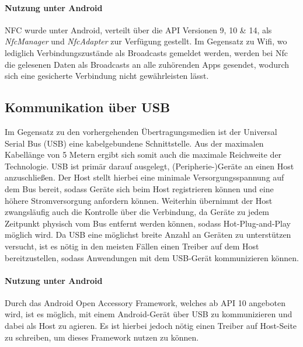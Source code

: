         \paragraph{Nutzung unter Android}
        NFC wurde unter Android, verteilt über die API Versionen 9, 10 \& 14,  als {\it NfcManager} und {\it NfcAdapter} zur Verfügung gestellt. Im Gegensatz zu Wifi, wo lediglich Verbindungszustände als Broadcasts gemeldet werden, werden bei Nfc die gelesenen Daten als Broadcasts an alle zuhörenden Apps gesendet, wodurch sich eine gesicherte Verbindung nicht gewährleisten lässt.

    \subsection{Kommunikation über USB}
        Im Gegensatz zu den vorhergehenden Übertragungsmedien ist der Universal Serial Bus (USB) eine kabelgebundene Schnittstelle. Aus der maximalen Kabellänge von 5 Metern
        ergibt sich somit auch die maximale Reichweite der Technologie. USB ist primär darauf ausgelegt, (Peripherie-)Geräte an einen Host anzuschließen.
        Der Host stellt hierbei eine minimale Versorgungsspannung auf dem Bus bereit, sodass Geräte sich beim Host registrieren können und eine höhere Stromversorgung anfordern können.
        Weiterhin übernimmt der Host zwangsläufig auch die Kontrolle über die Verbindung, da Geräte zu jedem Zeitpunkt physisch vom Bus entfernt werden können, sodass Hot-Plug-and-Play
        möglich wird. \cite[S.21-24]{Kelm}
        Da USB eine möglichst breite Anzahl an Geräten zu unterstützen versucht, ist es nötig in den meisten Fällen einen Treiber auf dem Host bereitzustellen, sodass Anwendungen mit dem USB-Gerät kommunizieren können.\cite[S.197]{Kelm}

        \paragraph{Nutzung unter Android}
        Durch das Android Open Accessory Framework, welches ab API 10 angeboten wird, ist es möglich, mit einem Android-Gerät über USB zu kommunizieren und dabei als Host zu agieren. Es ist hierbei jedoch nötig einen Treiber auf Host-Seite zu schreiben, um dieses Framework nutzen zu können.\cite{AOA}

